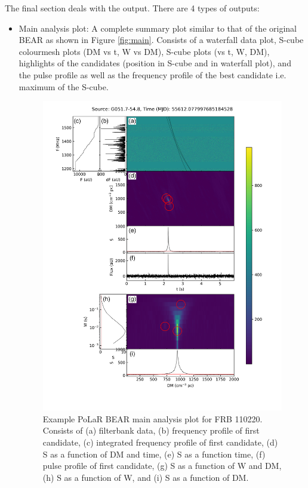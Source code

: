 The final section deals with the output. There are 4 types of outputs:
\begin{itemize}
    \item Main analysis plot: A complete summary plot similar to that of the original BEAR as shown in Figure \ref{fig:main}. Consists of a waterfall data plot, S-cube colourmesh plots (DM vs t, W vs DM), S-cube plots (vs t, W, DM), highlights of the candidates (position in S-cube and in waterfall plot), and the pulse profile as well as the frequency profile of the best candidate i.e. maximum of the S-cube.
    \begin{figure}
        \centering
        \includegraphics[width=\textwidth]{Images/Example/main.png}
        \caption[Example PoLaR BEAR main analysis plot]{Example PoLaR BEAR main analysis plot for FRB 110220. Consists of (a) filterbank data, (b) frequency profile of first candidate, (c) integrated frequency profile of first candidate, (d) S as a function of DM and time, (e) S as a function time, (f) pulse profile of first candidate, (g) S as a function of W and DM, (h) S as a function of W, and (i) S as a function of DM.}

\end{figure}
\end{itemize}
